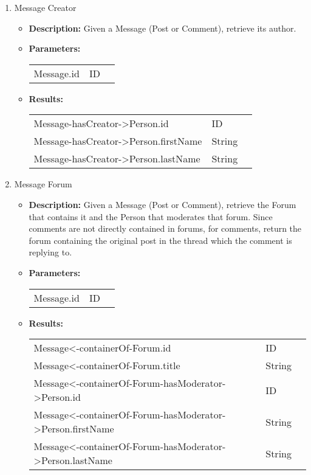 \begin{enumerate}
  \item Message Creator 
    \begin{itemize}
      \item \textbf{Description:}
        Given a Message (Post or Comment), retrieve its author.
      \item \textbf{Parameters:} \\
        \begin{tabular}{lll}
          Message.id 										& ID \\
        \end{tabular}
      \item \textbf{Results:} \\
        \begin{tabular}{lll}
          Message-hasCreator->Person.id     									& ID \\
          Message-hasCreator->Person.firstName     									& String \\
          Message-hasCreator->Person.lastName    									& String \\
        \end{tabular}
    \end{itemize}

  \item Message Forum 
    \begin{itemize}
      \item \textbf{Description:}
        Given a Message (Post or Comment), retrieve the Forum that contains it
        and the Person that moderates that forum. Since comments are not
        directly contained in forums, for comments, return the forum containing
        the original post in the thread which the comment is replying to. 
      \item \textbf{Parameters:} \\
        \begin{tabular}{lll}
          Message.id 										& ID \\
        \end{tabular}
      \item \textbf{Results:} \\
        \begin{tabular}{lll}
          Message<-containerOf-Forum.id                       & ID \\
          Message<-containerOf-Forum.title     									& String \\
          Message<-containerOf-Forum-hasModerator->Person.id     									& ID \\
          Message<-containerOf-Forum-hasModerator->Person.firstName    									& String \\
          Message<-containerOf-Forum-hasModerator->Person.lastName    									& String \\
        \end{tabular}
    \end{itemize}


\end{enumerate}
